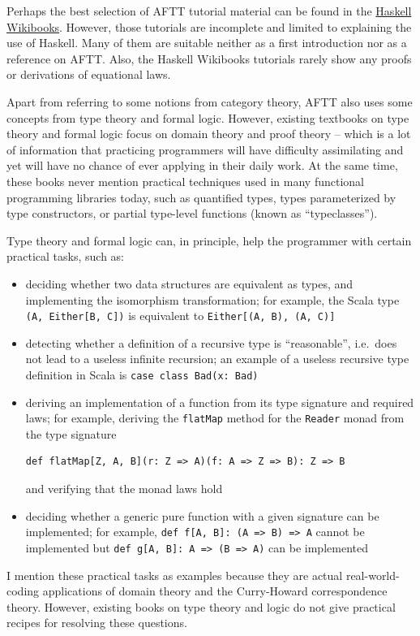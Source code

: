 Perhaps the best selection of AFTT tutorial material can be found
in the \href{https://en.wikibooks.org/wiki/Haskell}{Haskell Wikibooks}.
However, those tutorials are incomplete and limited to explaining
the use of Haskell. Many of them are suitable neither as a first introduction
nor as a reference on AFTT. Also, the Haskell Wikibooks tutorials
rarely show any proofs or derivations of equational laws.

Apart from referring to some notions from category theory, AFTT also
uses some concepts from type theory and formal logic. However, existing
textbooks on type theory and formal logic focus on domain theory and
proof theory – which is a lot of information that practicing programmers
will have difficulty assimilating and yet will have no chance of ever
applying in their daily work. At the same time, these books never
mention practical techniques used in many functional programming libraries
today, such as quantified types, types parameterized by type constructors,
or partial type-level functions (known as ``typeclasses'').

Type theory and formal logic can, in principle, help the programmer
with certain practical tasks, such as:
\begin{itemize}
\item deciding whether two data structures are equivalent as types, and
implementing the isomorphism transformation; for example, the Scala
type \lstinline!(A, Either[B, C])!
is equivalent to \lstinline!Either[(A, B), (A, C)]! 
\item detecting whether a definition of a recursive type is ``reasonable'',
i.e.~does not lead to a useless infinite recursion; an example of
a useless recursive type definition in Scala is \lstinline!case class Bad(x: Bad)! 
\item deriving an implementation of a function from its type signature and
required laws; for example, deriving the \lstinline!flatMap!
method for the \lstinline!Reader!
monad from the type signature 
\begin{lstlisting}
def flatMap[Z, A, B](r: Z => A)(f: A => Z => B): Z => B
\end{lstlisting}
 and verifying that the monad laws hold
\item deciding whether a generic pure function with a given signature can
be implemented; for example, \lstinline!def f[A, B]: (A => B) => A!
cannot be implemented but \lstinline!def g[A, B]: A => (B => A)!
can be implemented 
\end{itemize}
I mention these practical tasks as examples because they are actual
real-world-coding applications of domain theory and the Curry-Howard
correspondence theory. However, existing books on type theory and
logic do not give practical recipes for resolving these questions.


